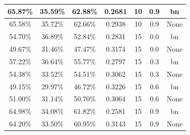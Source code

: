 \begin{table}[ht]
\begin{tabular}{|c|c|c|c|c|c|c|}
65.87\% & 35.59\% & 62.88\% & 0.2681 & 10 & 0.9 & bn\\ \hline
65.58\% & 35.72\% & 62.66\% & 0.2938 & 10 & 0.9 & None\\ \hline
54.70\% & 36.89\% & 52.84\% & 0.2831 & 15 & 0.0 & bn\\ \hline
49.67\% & 31.46\% & 47.47\% & 0.3174 & 15 & 0.0 & None\\ \hline
57.22\% & 36.64\% & 55.77\% & 0.2797 & 15 & 0.3 & bn\\ \hline
54.38\% & 33.52\% & 54.51\% & 0.3062 & 15 & 0.3 & None\\ \hline
49.15\% & 29.97\% & 46.72\% & 0.3226 & 15 & 0.6 & bn\\ \hline
51.00\% & 31.14\% & 50.70\% & 0.3064 & 15 & 0.6 & None\\ \hline
64.98\% & 34.08\% & 61.82\% & 0.2581 & 15 & 0.9 & bn\\ \hline
64.20\% & 33.50\% & 60.95\% & 0.3143 & 15 & 0.9 & None\\ \hline
\end{tabular}
\end{table}

